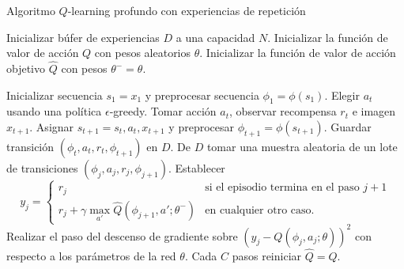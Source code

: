 \begin{algorithm}[H]
  	\caption{Algoritmo $Q$-learning profundo con experiencias de repetición}
	\label{alg:dqn-algo}
  \begin{algorithmic}[1]
  \STATE Inicializar búfer de experiencias $D$ a una capacidad $N$.
  \STATE Inicializar la función de valor de acción $Q$ con pesos aleatorios $\theta$.
  \STATE Inicializar la función de valor de acción objetivo $\hat{Q}$ con pesos $\theta^- = \theta$.
  
    \STATE Inicializar secuencia $s_1 = {x_1}$ y preprocesar secuencia $\phi_1 = \phi(s_1)$.
    \STATE Elegir $a_t$ usando una política $\epsilon$-greedy.
    \STATE Tomar acción $a_t$, observar recompensa $r_{t}$ e imagen $x_{t+1}$.
    \STATE Asignar $s_{t+1} =  s_t, a_t, x_{t+1}$ y preprocesar $\phi_{t+1} = \phi(s_{t+1})$.
    \STATE Guardar transición $(\phi_t, a_t, r_t, \phi_{t+1})$ en $D$.
    \STATE De $D$ tomar una muestra aleatoria de un lote de transiciones $(\phi_j, a_j, r_j, \phi_{j+1})$.
    \STATE Establecer
	\[
	 y_j = 
   \begin{cases} 
      r_j  & \mbox{si el episodio termina en el paso } j + 1 \\
      r_j + \gamma \max_{a'}\hat{Q}(\phi_{j+1}, a'; \theta^-) & \mbox{en cualquier otro caso.}
   \end{cases}
	\]
	\STATE Realizar el paso del
	descenso de gradiente sobre $(y_j -  Q(\phi_j,a_j;\theta))^2$ con respecto a los parámetros de la red $\theta$.
	\STATE Cada $C$ pasos reiniciar $\hat{Q} = Q$.
    \ENDFOR
  \ENDFOR
  \end{algorithmic}
\end{algorithm}

	
	
